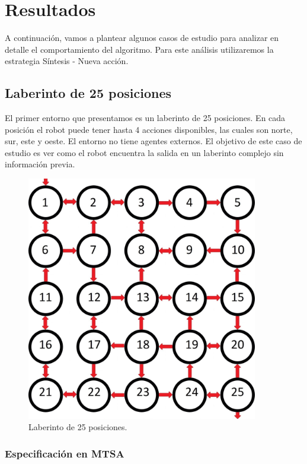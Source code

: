 \chapter{Resultados}

A continuación, vamos a plantear algunos casos de estudio para analizar en detalle el comportamiento del algoritmo. 
Para este análisis utilizaremos la estrategia Síntesis - Nueva acción.

\section{Laberinto de 25 posiciones}

El primer entorno que presentamos es un laberinto de 25 posiciones. En cada posición el robot puede tener hasta 4 
acciones disponibles, las cuales son norte, sur, este y oeste. El entorno no tiene agentes externos. El objetivo de 
este caso de estudio es ver como el robot encuentra la salida en un laberinto complejo sin información previa.

\begin{figure}[H]
	\centering
		\includegraphics[width=0.9\textwidth]{Imagenes/Laberintos/25.jpg}
	\caption{Laberinto de 25 posiciones.}
	\label{fig:25}
\end{figure}

\subsection{Especificación en MTSA}

